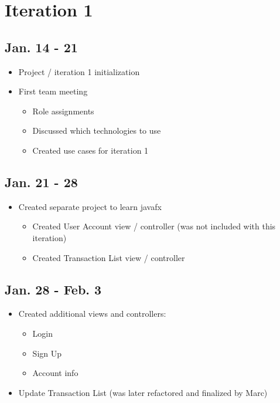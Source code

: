 \documentclass[12pt]{article}
\begin{document}
\maketitle

\section*{Iteration 1}

\subsection*{Jan. 14 - 21}
\begin{itemize}
    \item Project / iteration 1 initialization 
    \item First team meeting
    \begin{itemize}
        \item Role assignments
        \item Discussed which technologies to use
        \item Created use cases for iteration 1
    \end{itemize}
\end{itemize}

\subsection*{Jan. 21 - 28}
\begin{itemize}
    \item Created separate project to learn javafx
    \begin{itemize}
        \item Created User Account view / controller (was not included with this iteration)
        \item Created Transaction List view / controller
    \end{itemize}
\end{itemize}

\subsection*{Jan. 28 - Feb. 3}
\begin{itemize}
    \item Created additional views and controllers:
    \begin{itemize}
        \item Login
        \item Sign Up
        \item Account info
    \end{itemize}
    \item Update Transaction List (was later refactored and finalized by Marc)
\end{itemize}
\end{document}
